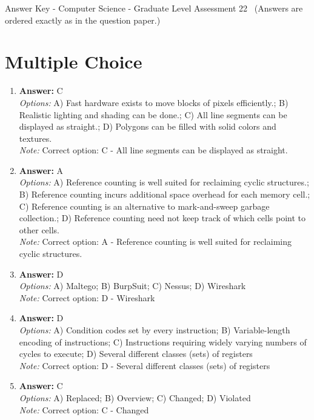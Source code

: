 \documentclass[12pt]{article}
\begin{document}
\begin{center}
Answer Key - Computer Science - Graduate Level Assessment 22 \
\small (Answers are ordered exactly as in the question paper.)
\end{center}

\section*{Multiple Choice}
\begin{enumerate}[label=\arabic*.]
\item \textbf{Answer:} C
\\ \textit{Options:} A) Fast hardware exists to move blocks of pixels efficiently.; B) Realistic lighting and shading can be done.; C) All line segments can be displayed as straight.; D) Polygons can be filled with solid colors and textures.
\\ \textit{Note:} Correct option: C - All line segments can be displayed as straight.
\item \textbf{Answer:} A
\\ \textit{Options:} A) Reference counting is well suited for reclaiming cyclic structures.; B) Reference counting incurs additional space overhead for each memory cell.; C) Reference counting is an alternative to mark-and-sweep garbage collection.; D) Reference counting need not keep track of which cells point to other cells.
\\ \textit{Note:} Correct option: A - Reference counting is well suited for reclaiming cyclic structures.
\item \textbf{Answer:} D
\\ \textit{Options:} A) Maltego; B) BurpSuit; C) Nessus; D) Wireshark
\\ \textit{Note:} Correct option: D - Wireshark
\item \textbf{Answer:} D
\\ \textit{Options:} A) Condition codes set by every instruction; B) Variable-length encoding of instructions; C) Instructions requiring widely varying numbers of cycles to execute; D) Several different classes (sets) of registers
\\ \textit{Note:} Correct option: D - Several different classes (sets) of registers
\item \textbf{Answer:} C
\\ \textit{Options:} A) Replaced; B) Overview; C) Changed; D) Violated
\\ \textit{Note:} Correct option: C - Changed
\end{enumerate}
\end{document}
